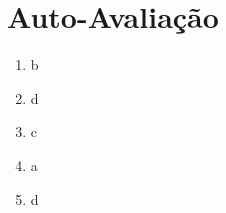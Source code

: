 \documentclass[12pt]{article}
\begin{document}



\newpage 
\section*{Auto-Avaliação}

\begin{enumerate}
    \item b
    \item d
    \item c
    \item a
    \item d
\end{enumerate}
\end{document}

